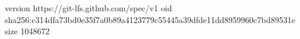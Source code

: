 version https://git-lfs.github.com/spec/v1
oid sha256:c314dfa73bd0e35f7a0b89a4123779c55445a39dfde11dd8959960c7bd89531e
size 1048672
